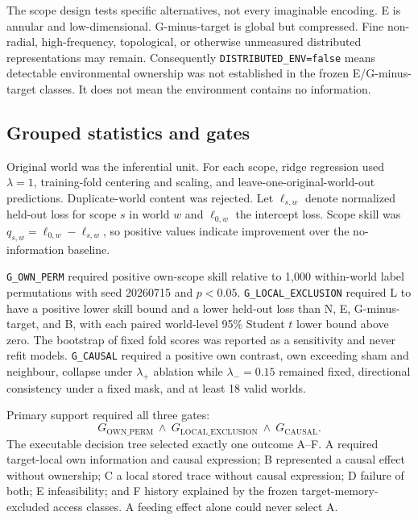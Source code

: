 \documentclass[11pt]{article}
\newcommand{\code}[1]{\texttt{#1}}
\begin{document}
The scope design tests specific alternatives, not every imaginable encoding. E is annular and low-dimensional. G-minus-target is global but compressed. Fine non-radial, high-frequency, topological, or otherwise unmeasured distributed representations may remain. Consequently \code{DISTRIBUTED\_ENV=false} means detectable environmental ownership was not established in the frozen E/G-minus-target classes. It does not mean the environment contains no information.

\subsection{Grouped statistics and gates}

Original world was the inferential unit. For each scope, ridge regression used $\lambda=1$, training-fold centering and scaling, and leave-one-original-world-out predictions. Duplicate-world content was rejected. Let $\ell_{s,w}$ denote normalized held-out loss for scope $s$ in world $w$ and $\ell_{0,w}$ the intercept loss. Scope skill was $q_{s,w}=\ell_{0,w}-\ell_{s,w}$, so positive values indicate improvement over the no-information baseline.

\code{G\_OWN\_PERM} required positive own-scope skill relative to 1,000 within-world label permutations with seed 20260715 and $p<0.05$. \code{G\_LOCAL\_EXCLUSION} required L to have a positive lower skill bound and a lower held-out loss than N, E, G-minus-target, and B, with each paired world-level 95\% Student $t$ lower bound above zero. The bootstrap of fixed fold scores was reported as a sensitivity and never refit models. \code{G\_CAUSAL} required a positive own contrast, own exceeding sham and neighbour, collapse under $\lambda_+$ ablation while $\lambda_-=0.15$ remained fixed, directional consistency under a fixed mask, and at least 18 valid worlds.

Primary support required all three gates:
\begin{equation}
G_{\mathrm{OWN\_PERM}}\ \land\ G_{\mathrm{LOCAL\_EXCLUSION}}\ \land\ G_{\mathrm{CAUSAL}}.
\end{equation}
The executable decision tree selected exactly one outcome A--F. A required target-local own information and causal expression; B represented a causal effect without ownership; C a local stored trace without causal expression; D failure of both; E infeasibility; and F history explained by the frozen target-memory-excluded access classes. A feeding effect alone could never select A.
\end{document}
